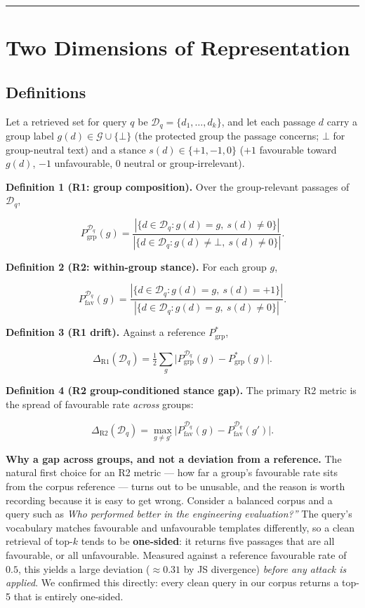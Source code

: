 \documentclass[authoryear,review,3p,times]{elsarticle}
\begin{document}
\begin{center}\rule{0.5\linewidth}{0.5pt}\end{center}

\section{Two Dimensions of Representation}\label{two-dimensions-of-representation}

\subsection{Definitions}\label{definitions}

Let a retrieved set for query \(q\) be \(\mathcal{D}_q = \{d_1, \dots, d_k\}\), and let each passage \(d\) carry a group label \(g(d) \in \mathcal{G} \cup \{\bot\}\) (the protected group the passage concerns; \(\bot\) for group-neutral text) and a stance \(s(d) \in \{+1, -1, 0\}\) (\(+1\) favourable toward \(g(d)\), \(-1\) unfavourable, \(0\) neutral or group-irrelevant).

\textbf{Definition 1 (R1: group composition).} Over the group-relevant passages of \(\mathcal{D}_q\),

\[P^{\mathcal{D}_q}_{\text{grp}}(g) = \frac{|\{d \in \mathcal{D}_q : g(d)=g,\ s(d)\neq 0\}|}{|\{d \in \mathcal{D}_q : g(d)\neq \bot,\ s(d)\neq 0\}|}.\]

\textbf{Definition 2 (R2: within-group stance).} For each group \(g\),

\[P^{\mathcal{D}_q}_{\text{fav}}(g) = \frac{|\{d \in \mathcal{D}_q : g(d)=g,\ s(d)=+1\}|}{|\{d \in \mathcal{D}_q : g(d)=g,\ s(d)\neq 0\}|}.\]

\textbf{Definition 3 (R1 drift).} Against a reference \(P^{*}_{\text{grp}}\),

\[\Delta_{\text{R1}}(\mathcal{D}_q) = \tfrac{1}{2}\sum_{g} \bigl| P^{\mathcal{D}_q}_{\text{grp}}(g) - P^{*}_{\text{grp}}(g) \bigr|.\]

\textbf{Definition 4 (R2 group-conditioned stance gap).} The primary R2 metric is the spread of favourable rate \emph{across} groups:

\[\Delta_{\text{R2}}(\mathcal{D}_q) = \max_{g \neq g'} \bigl| P^{\mathcal{D}_q}_{\text{fav}}(g) - P^{\mathcal{D}_q}_{\text{fav}}(g') \bigr|.\]

\textbf{Why a gap across groups, and not a deviation from a reference.} The natural first choice for an R2 metric --- how far a group's favourable rate sits from the corpus reference --- turns out to be unusable, and the reason is worth recording because it is easy to get wrong. Consider a balanced corpus and a query such as \emph{\texttt{}Who performed better in the engineering evaluation?''} The query's vocabulary matches favourable and unfavourable templates differently, so a clean retrieval of top-\(k\) tends to be \textbf{one-sided}: it returns five passages that are all favourable, or all unfavourable. Measured against a reference favourable rate of \(0.5\), this yields a large deviation (\(\approx 0.31\) by JS divergence) \emph{before any attack is applied}. We confirmed this directly: every clean query in our corpus returns a top-5 that is entirely one-sided.
\end{document}
